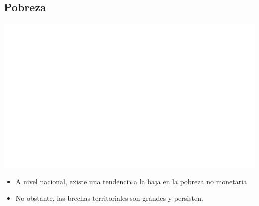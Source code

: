 \documentclass[aspectratio=169]{beamer}
\begin{document}
    
    \subsection{Pobreza}
    
    \begin{slide}{4} 
                      \begin{imagecolumn}
                \includegraphics[width=\columnwidth]{img/var_268_map.png}
            \end{imagecolumn}
            \begin{textcolumn}
                \begin{itemize}
                    \item A nivel nacional, existe una tendencia a la baja en la pobreza no monetaria
                    \item No obstante, las brechas territoriales son grandes y persisten.
                \end{itemize}
            \end{textcolumn}

    \printcolumns
    \end{slide}
     
\end{document}
